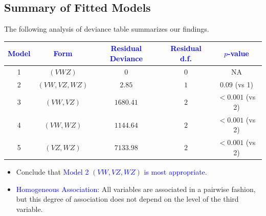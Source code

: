 \documentclass{article}\usepackage[]{graphicx}\usepackage[svgnames]{xcolor}
\begin{document}
\subsection*{Summary of Fitted Models}
The following analysis of deviance table summarizes our findings.
\begin{table}[H]
    \centering
    \begin{tabular}{ccccc}
        \toprule
        \textcolor{Blue}{Model} & \textcolor{Blue}{Form} & \textcolor{Blue}{Residual Deviance} & \textcolor{Blue}{Residual d.f.} & \textcolor{Blue}{$ p $-value} \\
        \midrule
        1                       & $ (VWZ) $              & 0                                   & 0                               & NA                            \\
        \midrule
        2                       & $(VW, VZ, WZ)$         & $2.85$                              & $1$                             & $0.09$ (vs 1)                 \\
        \midrule
        3                       & $(VW, VZ)$             & $1680.41$                           & $2$                             & $<0.001$ (vs 2)               \\
        4                       & $(VW, WZ)$             & $1144.64$                           & $2$                             & $<0.001$  (vs 2)              \\
        5                       & $(VZ, WZ)$             & $7133.98$                           & $2$                             & $<0.001$  (vs 2)              \\
        \bottomrule
    \end{tabular}
\end{table}
\begin{itemize}
    \item Conclude that \textcolor{Blue}{Model 2 $ (VW,VZ,WZ) $ is most appropriate}.
    \item \textcolor{Blue}{Homogeneous Association}: All variables are associated in a pairwise fashion, but
          this degree of association does not depend on the level of the third variable.
\end{itemize}
\end{document}
